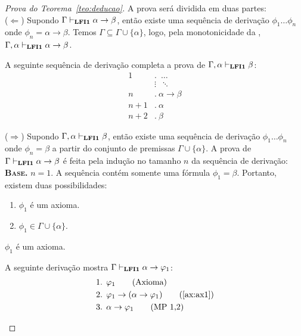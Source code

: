        \begin{proof}[Prova do Teorema~\ref{teo:deducao}] A prova será dividida em duas partes:\\
            ($\Longleftarrow$) Supondo $\Gamma \vdash_{{\normalfont\textbf{LFI1}}{}} \alpha \to \beta$, então existe uma sequência de derivação $\phi_{1} \ldots \phi_{n}$ onde $\phi_{n} = \alpha \to \beta$. Temos $\Gamma \subseteq \Gamma \cup \{\alpha\}$, logo, pela monotonicidade da \lfium{}, $\Gamma, \alpha \vdash_{{\normalfont\textbf{LFI1}}{}} \alpha \to \beta$.
            
            A seguinte sequência de derivação completa a prova de $\Gamma, \alpha \vdash_{{\normalfont\textbf{LFI1}}{}} \beta$:
            \begin{align*}
                \text{1}&.~ \; \ldots\\
                & \vdots \; ~\ddots\\
                \text{$n$}&.~ \alpha \to \beta\tag{Resultado da suposição}\\
                \text{$n + 1$}&.~ \alpha\tag{Premissa}\\
                \text{$n + 2$}&.~ \beta\tag{MP $n, n + 1$}
            \end{align*}

            \noindent  ($\Longrightarrow$) Supondo $\Gamma, \alpha \vdash_{{\normalfont\textbf{LFI1}}{}} \beta$, então existe uma sequência de derivação $\phi_{1} \ldots \phi_{n}$ onde $\phi_{n} = \beta$ a partir do conjunto de premissas $\Gamma \cup \{\alpha\}$. A prova de $\Gamma \vdash_{{\normalfont\textbf{LFI1}}{}} \alpha \to \beta$ é feita pela indução no tamanho $n$ da sequência de derivação:\\

            \noindent \textbf{\textsc{Base.}} $n = 1$.
            A sequência contém somente uma fórmula $\phi_{1} = \beta$. Portanto, existem duas possibilidades:
            \begin{enumerate}
                \item $\phi_{1}$ é um axioma.
                \item $\phi_{1} \in \Gamma \cup \{\alpha\}$.
            \end{enumerate}

            \begin{provaporcasos}
                \casodeprova{} $\phi_{1}$ é um axioma. 
                
                    A seguinte derivação mostra $\Gamma \vdash_{{\normalfont\textbf{LFI1}}{}} \alpha \to \varphi_{1}$:
                    \begin{align*}
                        & \text{1. } \phi_{1} \tag{Axioma}\\
                        & \text{2. } \phi_{1} \to (\alpha \to \phi_{1}) \tag{\ref{ax:ax1}}\\
                        & \text{3. } \alpha \to \phi_{1} \tag{MP 1,2}
                    \end{align*}


\end{provaporcasos}
\end{proof}
